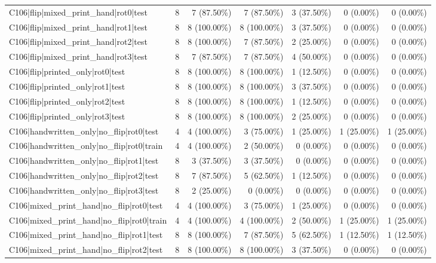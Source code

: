 \begin{longtable}{>{\raggedright\arraybackslash}p{5cm}rrrrrr}
C106|flip|mixed\_print\_hand|rot0|test & 8 & 7 (87.50\%) & 7 (87.50\%) & 3 (37.50\%) & 0 (0.00\%) & 0 (0.00\%) \\
C106|flip|mixed\_print\_hand|rot1|test & 8 & 8 (100.00\%) & 8 (100.00\%) & 3 (37.50\%) & 0 (0.00\%) & 0 (0.00\%) \\
C106|flip|mixed\_print\_hand|rot2|test & 8 & 8 (100.00\%) & 7 (87.50\%) & 2 (25.00\%) & 0 (0.00\%) & 0 (0.00\%) \\
C106|flip|mixed\_print\_hand|rot3|test & 8 & 7 (87.50\%) & 7 (87.50\%) & 4 (50.00\%) & 0 (0.00\%) & 0 (0.00\%) \\
C106|flip|printed\_only|rot0|test & 8 & 8 (100.00\%) & 8 (100.00\%) & 1 (12.50\%) & 0 (0.00\%) & 0 (0.00\%) \\
C106|flip|printed\_only|rot1|test & 8 & 8 (100.00\%) & 8 (100.00\%) & 3 (37.50\%) & 0 (0.00\%) & 0 (0.00\%) \\
C106|flip|printed\_only|rot2|test & 8 & 8 (100.00\%) & 8 (100.00\%) & 1 (12.50\%) & 0 (0.00\%) & 0 (0.00\%) \\
C106|flip|printed\_only|rot3|test & 8 & 8 (100.00\%) & 8 (100.00\%) & 2 (25.00\%) & 0 (0.00\%) & 0 (0.00\%) \\
C106|handwritten\_only|no\_flip|rot0|test & 4 & 4 (100.00\%) & 3 (75.00\%) & 1 (25.00\%) & 1 (25.00\%) & 1 (25.00\%) \\
C106|handwritten\_only|no\_flip|rot0|train & 4 & 4 (100.00\%) & 2 (50.00\%) & 0 (0.00\%) & 0 (0.00\%) & 0 (0.00\%) \\
C106|handwritten\_only|no\_flip|rot1|test & 8 & 3 (37.50\%) & 3 (37.50\%) & 0 (0.00\%) & 0 (0.00\%) & 0 (0.00\%) \\
C106|handwritten\_only|no\_flip|rot2|test & 8 & 7 (87.50\%) & 5 (62.50\%) & 1 (12.50\%) & 0 (0.00\%) & 0 (0.00\%) \\
C106|handwritten\_only|no\_flip|rot3|test & 8 & 2 (25.00\%) & 0 (0.00\%) & 0 (0.00\%) & 0 (0.00\%) & 0 (0.00\%) \\
C106|mixed\_print\_hand|no\_flip|rot0|test & 4 & 4 (100.00\%) & 3 (75.00\%) & 1 (25.00\%) & 0 (0.00\%) & 0 (0.00\%) \\
C106|mixed\_print\_hand|no\_flip|rot0|train & 4 & 4 (100.00\%) & 4 (100.00\%) & 2 (50.00\%) & 1 (25.00\%) & 1 (25.00\%) \\
C106|mixed\_print\_hand|no\_flip|rot1|test & 8 & 8 (100.00\%) & 7 (87.50\%) & 5 (62.50\%) & 1 (12.50\%) & 1 (12.50\%) \\
C106|mixed\_print\_hand|no\_flip|rot2|test & 8 & 8 (100.00\%) & 8 (100.00\%) & 3 (37.50\%) & 0 (0.00\%) & 0 (0.00\%) \\

\end{longtable}
